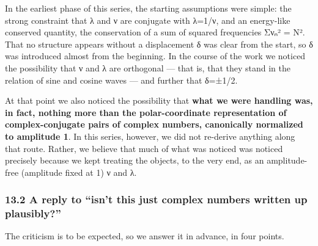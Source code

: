 \documentclass[
]{article}
\begin{document}
In the earliest phase of this series, the starting assumptions were
simple: the strong constraint that λ and ν are conjugate with λ=1/ν, and
an energy-like conserved quantity, the conservation of a sum of squared
frequencies Σνₙ² = N². That no structure appears without a displacement
δ was clear from the start, so δ was introduced almost from the
beginning. In the course of the work we noticed the possibility that ν
and λ are orthogonal --- that is, that they stand in the relation of
sine and cosine waves --- and further that δ=±1/2.

At that point we also noticed the possibility that \textbf{what we were
handling was, in fact, nothing more than the polar-coordinate
representation of complex-conjugate pairs of complex numbers,
canonically normalized to amplitude 1}. In this series, however, we did
not re-derive anything along that route. Rather, we believe that much of
what was noticed was noticed precisely because we kept treating the
objects, to the very end, as an amplitude-free (amplitude fixed at 1) ν
and λ.

\subsubsection{13.2 A reply to ``isn't this just complex numbers written
up
plausibly?''}\label{a-reply-to-isnt-this-just-complex-numbers-written-up-plausibly}

The criticism is to be expected, so we answer it in advance, in four
points.
\end{document}
